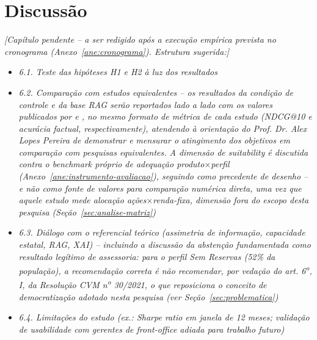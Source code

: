 \chapter{Discuss\~ao}
\label{cap:discussao}


\textit{[Cap\'itulo pendente -- a ser redigido ap\'os a execu\c{c}\~ao
emp\'irica prevista no cronograma (Anexo~\ref{ane:cronograma}). Estrutura
sugerida:]}

\begin{itemize}
  \item[] \textit{6.1. Teste das hip\'oteses H1 e H2 \`a luz dos resultados}
  \item[] \textit{6.2. Compara\c{c}\~ao com estudos equivalentes -- os
  resultados da condi\c{c}\~ao de controle e da base RAG ser\~ao
  reportados lado a lado com os valores publicados por
  \textcite{kim2025} e \textcite{akinfaderin2025}, no mesmo formato de
  m\'etrica de cada estudo (NDCG@10 e acur\'acia factual,
  respectivamente), atendendo \`a orienta\c{c}\~ao do Prof. Dr. Alex
  Lopes Pereira de demonstrar e mensurar o atingimento dos objetivos em
  compara\c{c}\~ao com pesquisas equivalentes. A dimens\~ao de
  suitability \'e discutida contra o benchmark pr\'oprio de
  adequa\c{c}\~ao produto$\times$perfil (Anexo~\ref{ane:instrumento-avaliacao}),
  seguindo \textcite{oehler2024} como precedente de desenho -- e n\~ao
  como fonte de valores para compara\c{c}\~ao num\'erica direta, uma vez
  que aquele estudo mede aloca\c{c}\~ao a\c{c}\~oes$\times$renda-fixa,
  dimens\~ao fora do escopo desta pesquisa (Se\c{c}\~ao~\ref{sec:analise-matriz})}
  \item[] \textit{6.3. Di\'alogo com o referencial te\'orico (assimetria de informa\c{c}\~ao, capacidade estatal, RAG, XAI) -- incluindo a discuss\~ao da absten\c{c}\~ao fundamentada como resultado leg\'itimo de assessoria: para o perfil Sem Reservas (52\% da popula\c{c}\~ao), a recomenda\c{c}\~ao correta \'e n\~ao recomendar, por veda\c{c}\~ao do art. 6\textsuperscript{o}, I, da Resolu\c{c}\~ao CVM n\textsuperscript{o} 30/2021, o que reposiciona o conceito de democratiza\c{c}\~ao adotado nesta pesquisa (ver Se\c{c}\~ao~\ref{sec:problematica})}
  \item[] \textit{6.4. Limita\c{c}\~oes do estudo (ex.: Sharpe ratio em janela de 12 meses; valida\c{c}\~ao de usabilidade com gerentes de front-office adiada para trabalho futuro)}
\end{itemize}

